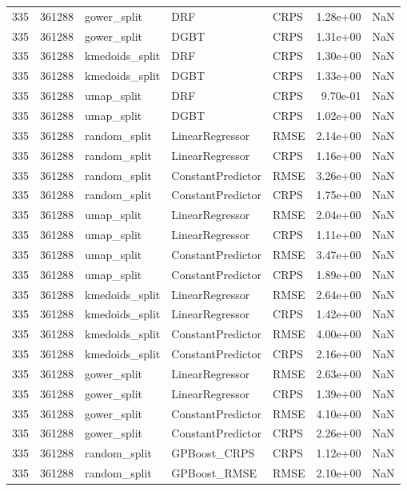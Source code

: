 \begin{tabular}{rrlllrr}
335 & 361288 & gower\_split & DRF & CRPS & 1.28e+00 & NaN \\
335 & 361288 & gower\_split & DGBT & CRPS & 1.31e+00 & NaN \\
335 & 361288 & kmedoids\_split & DRF & CRPS & 1.30e+00 & NaN \\
335 & 361288 & kmedoids\_split & DGBT & CRPS & 1.33e+00 & NaN \\
335 & 361288 & umap\_split & DRF & CRPS & 9.70e-01 & NaN \\
335 & 361288 & umap\_split & DGBT & CRPS & 1.02e+00 & NaN \\
335 & 361288 & random\_split & LinearRegressor & RMSE & 2.14e+00 & NaN \\
335 & 361288 & random\_split & LinearRegressor & CRPS & 1.16e+00 & NaN \\
335 & 361288 & random\_split & ConstantPredictor & RMSE & 3.26e+00 & NaN \\
335 & 361288 & random\_split & ConstantPredictor & CRPS & 1.75e+00 & NaN \\
335 & 361288 & umap\_split & LinearRegressor & RMSE & 2.04e+00 & NaN \\
335 & 361288 & umap\_split & LinearRegressor & CRPS & 1.11e+00 & NaN \\
335 & 361288 & umap\_split & ConstantPredictor & RMSE & 3.47e+00 & NaN \\
335 & 361288 & umap\_split & ConstantPredictor & CRPS & 1.89e+00 & NaN \\
335 & 361288 & kmedoids\_split & LinearRegressor & RMSE & 2.64e+00 & NaN \\
335 & 361288 & kmedoids\_split & LinearRegressor & CRPS & 1.42e+00 & NaN \\
335 & 361288 & kmedoids\_split & ConstantPredictor & RMSE & 4.00e+00 & NaN \\
335 & 361288 & kmedoids\_split & ConstantPredictor & CRPS & 2.16e+00 & NaN \\
335 & 361288 & gower\_split & LinearRegressor & RMSE & 2.63e+00 & NaN \\
335 & 361288 & gower\_split & LinearRegressor & CRPS & 1.39e+00 & NaN \\
335 & 361288 & gower\_split & ConstantPredictor & RMSE & 4.10e+00 & NaN \\
335 & 361288 & gower\_split & ConstantPredictor & CRPS & 2.26e+00 & NaN \\
335 & 361288 & random\_split & GPBoost\_CRPS & CRPS & 1.12e+00 & NaN \\
335 & 361288 & random\_split & GPBoost\_RMSE & RMSE & 2.10e+00 & NaN \\

\end{tabular}
